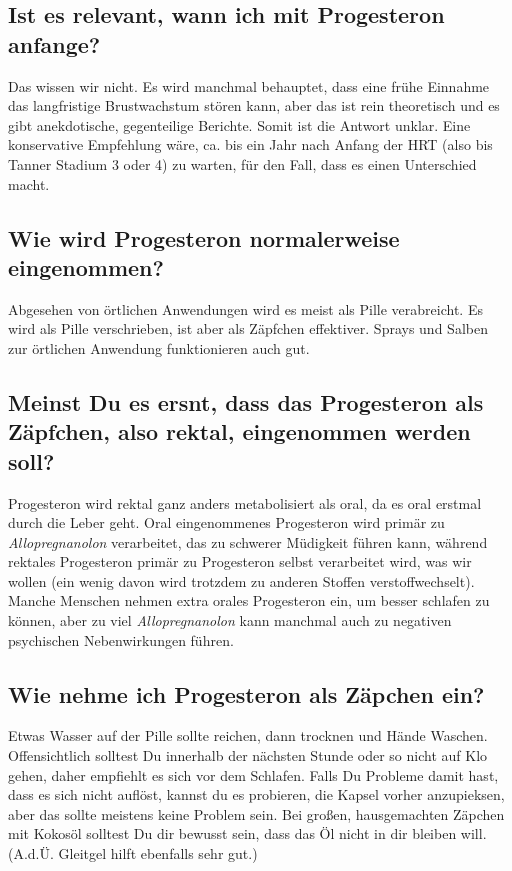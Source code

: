 \documentclass{article}
\begin{document}
{{\subsection{Ist es relevant, wann ich mit Progesteron anfange?}

Das wissen wir nicht. Es wird manchmal behauptet, dass eine frühe Einnahme das langfristige Brustwachstum stören kann, aber das ist rein theoretisch und es gibt anekdotische, gegenteilige Berichte. Somit ist die Antwort unklar. Eine konservative Empfehlung wäre, ca. bis ein Jahr nach Anfang der HRT (also bis Tanner Stadium 3 oder 4) zu warten, für den Fall, dass es einen Unterschied macht.

\subsection{Wie wird Progesteron normalerweise eingenommen?}

Abgesehen von örtlichen Anwendungen wird es meist als Pille verabreicht. Es wird als Pille verschrieben, ist aber als Zäpfchen effektiver. Sprays und Salben zur örtlichen Anwendung funktionieren auch gut.

\subsection{Meinst Du es ersnt, dass das Progesteron als Zäpfchen, also rektal, eingenommen werden soll?}

Progesteron wird rektal ganz anders metabolisiert als oral, da es oral erstmal durch die Leber geht. Oral eingenommenes Progesteron wird primär zu \textit{Allopregnanolon} verarbeitet, das zu schwerer Müdigkeit führen kann, während rektales Progesteron primär zu Progesteron selbst verarbeitet wird, was wir wollen (ein wenig davon wird trotzdem zu anderen Stoffen verstoffwechselt). Manche Menschen nehmen extra orales Progesteron ein, um besser schlafen zu können, aber zu viel \textit{Allopregnanolon }kann manchmal auch zu negativen psychischen Nebenwirkungen führen.

\subsection{Wie nehme ich Progesteron als Zäpchen ein?}

Etwas Wasser auf der Pille sollte reichen, dann trocknen und Hände Waschen. Offensichtlich solltest Du innerhalb der nächsten Stunde oder so nicht auf Klo gehen, daher empfiehlt es sich vor dem Schlafen. Falls Du Probleme damit hast, dass es sich nicht auflöst, kannst du es probieren, die Kapsel vorher anzupieksen, aber das sollte meistens keine Problem sein. Bei großen, hausgemachten Zäpchen mit Kokosöl solltest Du dir bewusst sein, dass das Öl nicht in dir bleiben will. (A.d.Ü. Gleitgel hilft ebenfalls sehr gut.)

}}
\end{document}
